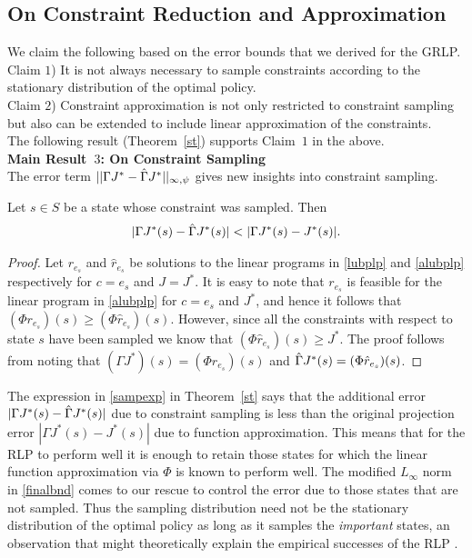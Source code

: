 \subsection{On Constraint Reduction and Approximation}
We claim the following based on the error bounds that we derived for the GRLP.\\
{Claim $1$)} It is not always necessary to sample constraints according to the stationary distribution of the optimal policy.\\
{Claim $2$)} Constraint approximation is not only restricted to constraint sampling but also can be extended to include linear approximation of the constraints.\\
The following result (Theorem~\ref{st}) supports Claim~$1$ in the above.\\
\textbf{Main Result~$3$: On Constraint Sampling}\\
The error term $||\Gamma J^*-\hat{\Gamma} J^*||_{\infty,\psi}$ gives new insights into constraint sampling. 
\begin{theorem}\label{st}
Let $s\in S$ be a state whose constraint was sampled. Then
\begin{align}\label{sampexp}
|\Gamma J^*(s)-\hg J^*(s)|<|\Gamma J^*(s)-J^*(s)|.
\end{align}
\end{theorem}
\begin{proof}
Let $r_{e_s}$ and $\hat{r}_{e_s}$ be solutions to the linear programs in \eqref{lubplp} and \eqref{alubplp} respectively for $c=e_s$ and $J=J^*$. It is easy to note that $r_{e_s}$ is feasible for the linear program in \eqref{alubplp} for $c=e_s$ and $J^*$, and hence it follows that $(\Phi r_{e_s})(s)\geq (\Phi \hat{r}_{e_s})(s)$. However, since all the constraints with respect to state $s$ have been sampled we know that $(\Phi \hat{r}_{e_s})(s)\geq J^*$. The proof follows from noting that $(\Gamma J^*)(s)=(\Phi r_{e_s})(s)$ and $\hat{\Gamma} J^*(s)=(\Phi \hat{r}_{e_s})(s)$.
\end{proof}

The expression in \eqref{sampexp} in Theorem~\ref{st} says that the additional error $|\Gamma J^*(s) -\hat{\Gamma} J^*(s)|$ due to constraint sampling is less than the original projection error $|\Gamma J^*(s)-J^*(s)|$ due to function approximation. This means that for the RLP to perform well it is enough to retain those states for which the linear function approximation via $\Phi$ is known to perform well. The modified $L_\infty$ norm in \eqref{finalbnd} comes to our rescue to control the error due to those states that are not sampled. Thus the sampling distribution need not be the stationary distribution of the optimal policy as long as it samples the \emph{important} states, an observation that might theoretically explain the empirical successes of the RLP \cite{ALP,CST,SALP}.

